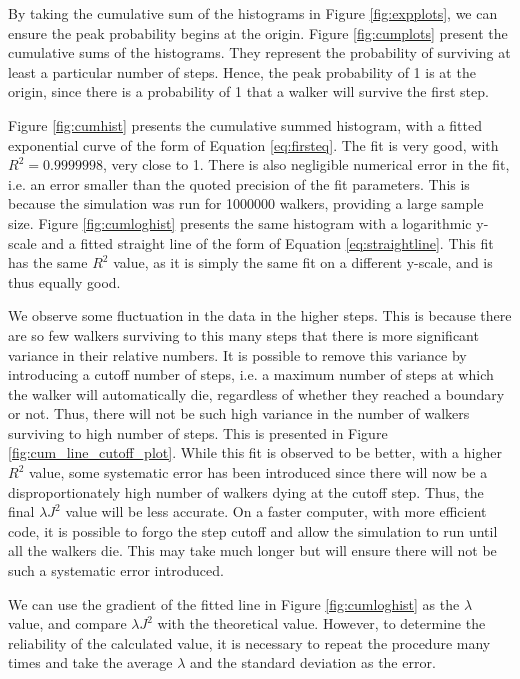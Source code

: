 \documentclass[journal]{IEEEtran}
\begin{document}
By taking the cumulative sum of the histograms in Figure \ref{fig:expplots}, we
can ensure the peak probability begins at the origin. Figure \ref{fig:cumplots}
present the cumulative sums of the histograms. They represent the probability of
surviving at least a particular number of steps. Hence, the peak probability of
1 is at the origin, since there is a probability of 1 that a walker will survive
the first step.

Figure \ref{fig:cumhist} presents the cumulative summed histogram, with a fitted
exponential curve of the form of Equation \ref{eq:firsteq}. The fit is very
good, with $R^2 = 0.9999998$, very close to 1. There is also negligible
numerical error in the fit, i.e. an error smaller than the quoted precision of
the fit parameters. This is because the simulation was run for 1000000 walkers,
providing a large sample size. Figure \ref{fig:cumloghist} presents the same
histogram with a logarithmic y-scale and a fitted straight line of the form of
Equation \ref{eq:straightline}. This fit has the same $R^2$ value, as it is
simply the same fit on a different y-scale, and is thus equally good.

We observe some fluctuation in the data in the higher steps. This is because
there are so few walkers surviving to this many steps that there is more
significant variance in their relative numbers. It is possible to remove this
variance by introducing a cutoff number of steps, i.e. a maximum number of steps
at which the walker will automatically die, regardless of whether they reached a
boundary or not. Thus, there will not be such high variance in the number of
walkers surviving to high number of steps. This is presented in Figure
\ref{fig:cum_line_cutoff_plot}. While this fit is observed to be better, with a
higher $R^2$ value, some systematic error has been introduced since there will now
be a disproportionately high number of walkers dying at the cutoff step. Thus,
the final $\lambda J^2$ value will be less accurate. On a faster computer, with
more efficient code, it is possible to forgo the step cutoff and allow the
simulation to run until all the walkers die. This may take much longer but will
ensure there will not be such a systematic error introduced.

We can use the gradient of the fitted line in Figure \ref{fig:cumloghist} as the
$\lambda$ value, and compare $\lambda J^2$ with the theoretical value. However,
to determine the reliability of the calculated value, it is necessary to repeat
the procedure many times and take the average $\lambda$ and the standard
deviation as the error.
\end{document}
